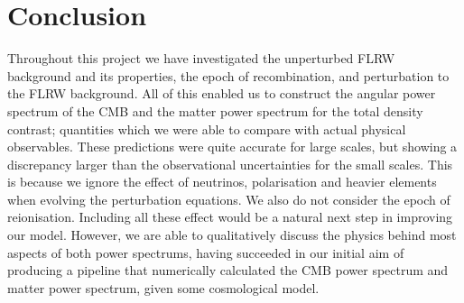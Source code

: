 \newpage
\section{Conclusion}\label{sec:conclusion}

Throughout this project we have investigated the unperturbed FLRW background and its properties, the epoch of recombination, and perturbation to the FLRW background. All of this enabled us to construct the angular power spectrum of the CMB and the matter power spectrum for the total density contrast; quantities which we were able to compare with actual physical observables. These predictions were quite accurate for large scales, but showing a discrepancy larger than the observational uncertainties for the small scales. This is because we ignore the effect of neutrinos, polarisation and heavier elements when evolving the perturbation equations. We also do not consider the epoch of reionisation. Including all these effect would be a natural next step in improving our model. However, we are able to qualitatively discuss the physics behind most aspects of both power spectrums, having succeeded in our initial aim of producing a pipeline that numerically calculated the CMB power spectrum and matter power spectrum, given some cosmological model.